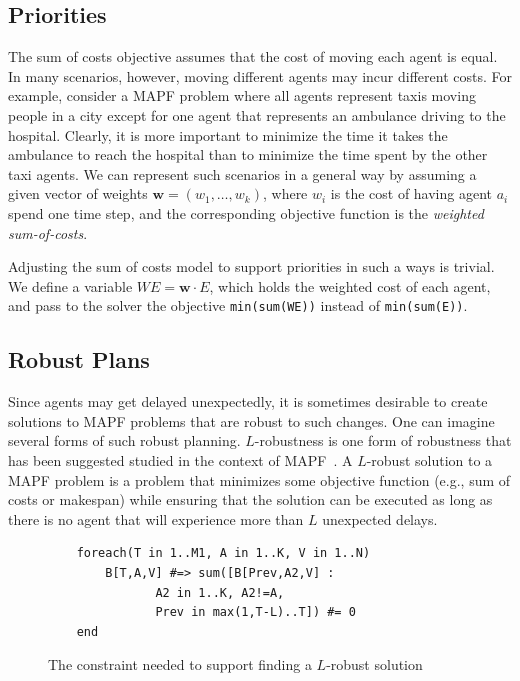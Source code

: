\documentclass[conference]{IEEEtran}
\begin{document}
\subsection{\label{sec:prior}Priorities}
The sum of costs objective assumes that the cost of moving each agent is equal. In many scenarios, however, moving different agents may incur different costs. For example, consider a MAPF problem where all agents represent taxis moving people in a city except for one agent that represents an ambulance driving to the hospital. Clearly, it is more important to minimize the time it takes the ambulance to reach the hospital than to minimize the time spent by the other taxi agents. We can represent such scenarios in a general way by assuming a given vector of weights $\textbf{w}=(w_1,\ldots,w_k)$, 
where $w_i$ is the cost of having agent $a_i$ spend one time step, 
and the corresponding objective function is the {\em weighted sum-of-costs}. 

Adjusting the sum of costs model to support priorities in such a ways is trivial. 
We define a variable $WE = \textbf{w}\cdot E$, which holds the weighted cost of each agent, and pass to the solver the objective \texttt{min(sum(WE))} instead of 
\texttt{min(sum(E))}.

\subsection{Robust Plans}
Since agents may get delayed unexpectedly, 
it is sometimes desirable to create solutions to MAPF problems
that are robust to such changes. One can imagine several forms of such robust planning. 
$L$-robustness is one form of robustness that has been suggested studied in the context of MAPF~\cite{atzmon2017kRobust}. A $L$-robust solution to a MAPF problem is a problem 
that minimizes some objective function (e.g., sum of costs or makespan)
while ensuring that the solution can be executed as long
as there is no agent that will experience more than $L$ unexpected delays. 

\begin{figure}
\small
\centering
\begin{verbatim}
	foreach(T in 1..M1, A in 1..K, V in 1..N)
   		B[T,A,V] #=> sum([B[Prev,A2,V] : 
               A2 in 1..K, A2!=A, 
               Prev in max(1,T-L)..T]) #= 0
	end
\end{verbatim}
\caption{The constraint needed to support finding a $L$-robust solution}
\label{fig:addRobustness}
\end{figure}
\end{document}
